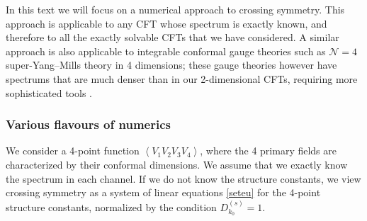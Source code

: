 \documentclass[12pt, a4paper]{article}
\theoremstyle{break}
\begin{document}
In this text we will focus on a numerical approach to crossing symmetry. This approach is applicable to any CFT whose spectrum is exactly known, and therefore to all the exactly solvable CFTs that we have considered. 
A similar approach is also applicable to integrable conformal gauge theories such as $\mathcal{N}=4$ super-Yang--Mills theory in 4 dimensions; these gauge theories however have spectrums that are much denser than in our 2-dimensional CFTs, requiring more sophisticated tools \cite{cgjp22}.

\subsubsection{Various flavours of numerics}\label{sec:vfn}

We consider a 4-point function $\left<V_1V_2V_3V_4\right>$, where the 4 primary fields are characterized by their conformal dimensions.
We assume that we exactly know the spectrum in each channel. If we do not know the structure constants, we view crossing symmetry as a system of linear equations \eqref{seteu} for the 4-point structure constants, normalized by the condition $D_{k_0}^{(s)}=1$. 
\end{document}
